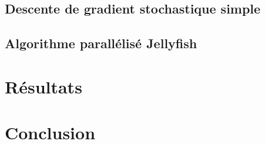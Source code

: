 \documentclass[10pt,a4paper]{article}
\begin{document}
\subsection{Descente de gradient stochastique simple}



\subsection{Algorithme parallélisé Jellyfish }





\section{Résultats}





\section*{Conclusion}

\newpage



\end{document}
